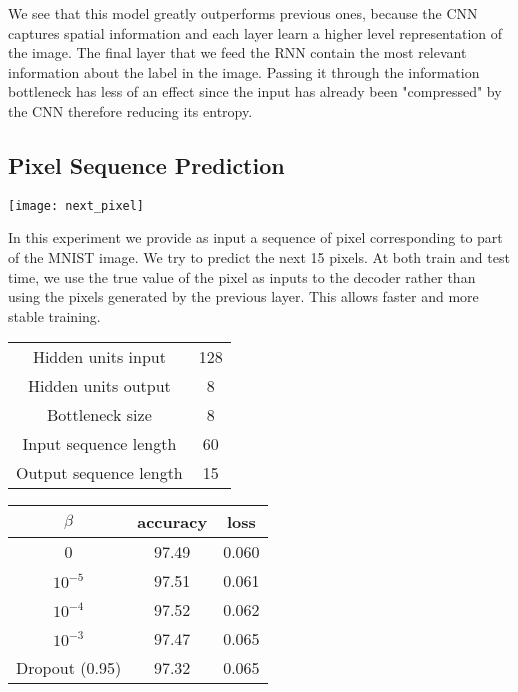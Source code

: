 \documentclass[11pt,oneside,openright]{report}
\begin{document}
We see that this model greatly outperforms previous ones, because the CNN captures spatial information and each layer learn a higher level representation of the image. The final layer that we feed the RNN contain the most relevant information about the label in the image. Passing it through the information bottleneck has less of an effect since the input has already been "compressed" by the CNN therefore reducing its entropy.

\subsection{Pixel Sequence Prediction}
\begin{center}
\texttt{[image: next\_pixel]}
\end{center}

In this experiment we provide as input a sequence of pixel corresponding to part of the MNIST image. We try to predict the next 15 pixels. At both train and test time, we use the true value of the pixel as inputs to the decoder rather than using the pixels generated by the previous layer. This allows faster and more stable training.

\begin{minipage}{0.5\textwidth}
        \centering
\begin{tabular}{ c | c  }
 Hidden units input & 128 \\
 Hidden units output & 8 \\
 Bottleneck size & 8 \\
 Input sequence length & 60 \\
 Output sequence length & 15 \\
\end{tabular}
    \end{minipage}\hfill
    \begin{minipage}{0.5\textwidth}
        \centering
\begin{tabular}{ c | c c }
 $\beta$ & accuracy & loss \\
 \hline
0  &  97.49  & 0.060 \\
$10^{-5}$  & 97.51 & 0.061  \\
$10^{-4}$  & 97.52 & 0.062  \\
$10^{-3}$  & 97.47 & 0.065  \\
\hline
\hline
Dropout (0.95) & 97.32 & 0.065
\end{tabular}
    \end{minipage}
    
\end{document}
